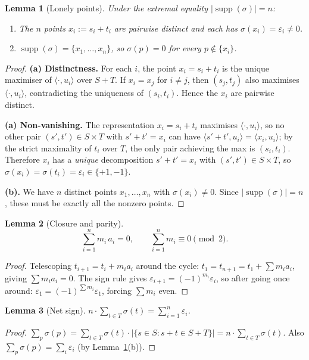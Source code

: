 \documentclass{article}
\newtheorem{lemma}{Lemma}
\begin{document}
\begin{lemma}[Lonely points]\label{lem:lonely}
Under the extremal equality $|\operatorname{supp}(\sigma)|=n$\textup{:}
\begin{enumerate}
\item[\textup{(a)}] The $n$ points $x_i:=s_i+t_i$ are pairwise distinct and each has
      $\sigma(x_i)=\varepsilon_i\ne 0$.
\item[\textup{(b)}] $\operatorname{supp}(\sigma)=\{x_1,\dots,x_n\}$, so $\sigma(p)=0$ for
      every $p\notin\{x_i\}$.
\end{enumerate}
\end{lemma}
\begin{proof}
\textbf{(a) Distinctness.}
For each $i$, the point $x_i=s_i+t_i$ is the unique maximiser of $\langle\cdot,u_i\rangle$
over $S+T$.  If $x_i=x_j$ for $i\ne j$, then $(s_j,t_j)$ also maximises
$\langle\cdot,u_i\rangle$, contradicting the uniqueness of $(s_i,t_i)$.
Hence the $x_i$ are pairwise distinct.

\textbf{(a) Non-vanishing.}
The representation $x_i = s_i+t_i$ maximises $\langle\cdot,u_i\rangle$, so no other
pair $(s',t')\in S\times T$ with $s'+t'=x_i$ can have
$\langle s'+t',u_i\rangle=\langle x_i,u_i\rangle$; by the strict maximality of $t_i$
over $T$, the only pair achieving the max is $(s_i,t_i)$.  Therefore
$x_i$ has a \emph{unique} decomposition $s'+t'=x_i$ with $(s',t')\in S\times T$,
so $\sigma(x_i)=\sigma(t_i)=\varepsilon_i\in\{+1,-1\}$.

\textbf{(b).}
We have $n$ distinct points $x_1,\dots,x_n$ with $\sigma(x_i)\ne 0$.
Since $|\operatorname{supp}(\sigma)|=n$, these must be exactly all the nonzero points.
\end{proof}

\begin{lemma}[Closure and parity]\label{lem:closure}
\[
  \sum_{i=1}^n m_i\,a_i = 0, \qquad \sum_{i=1}^n m_i \equiv 0 \pmod{2}.
\]
\end{lemma}
\begin{proof}
Telescoping $t_{i+1}=t_i+m_i a_i$ around the cycle:
$t_1 = t_{n+1} = t_1 + \sum m_i a_i$, giving $\sum m_i a_i=0$.
The sign rule gives $\varepsilon_{i+1}=(-1)^{m_i}\varepsilon_i$, so after going
once around: $\varepsilon_1 = (-1)^{\sum m_i}\varepsilon_1$, forcing $\sum m_i$ even.
\end{proof}

\begin{lemma}[Net sign]\label{lem:netsign}
$n\cdot\!\sum_{t\in T}\sigma(t)=\sum_{i=1}^n\varepsilon_i$.
\end{lemma}
\begin{proof}
$\sum_{p}\sigma(p)
  =\sum_{t\in T}\sigma(t)\cdot|\{s\in S: s+t\in S+T\}|
  = n\cdot\sum_{t\in T}\sigma(t)$.
Also $\sum_p\sigma(p)=\sum_i\varepsilon_i$ (by Lemma~\ref{lem:lonely}(b)).
\end{proof}
\end{document}
